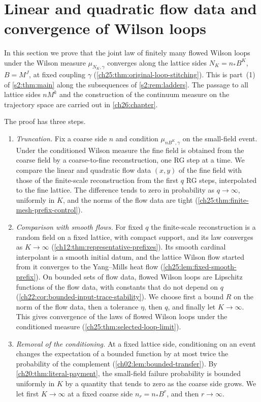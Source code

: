 \chapter{Linear and quadratic flow data and convergence of Wilson loops}\label{ch25:chapter}

In this section we prove that the joint law of finitely many flowed Wilson loops under the Wilson measure $\mu_{N_K,\gamma}$ converges along the lattice sides $N_K=n_*B^K$, $B=M^J$, at fixed coupling $\gamma$ (\cref{ch25:thm:original-loop-stitching}). This is part~(1) of \cref{s2:thm:main} along the subsequences of \cref{s2:rem:ladders}. The passage to all lattice sides $nM^k$ and the construction of the continuum measure on the trajectory space are carried out in \cref{ch26:chapter}.

The proof has three steps.
\begin{enumerate}
\item \emph{Truncation.} Fix a coarse side $n$ and condition $\mu_{nB^K,\gamma}$ on the small-field event. Under the conditioned Wilson measure the fine field is obtained from the coarse field by a coarse-to-fine reconstruction, one RG step at a time. We compare the linear and quadratic flow data $(x,y)$ of the fine field with those of the finite-scale reconstruction from the first $q$ RG steps, interpolated to the fine lattice. The difference tends to zero in probability as $q\to\infty$, uniformly in $K$, and the norms of the flow data are tight (\cref{ch25:thm:finite-mesh-prefix-control}).
\item \emph{Comparison with smooth flows.} For fixed $q$ the finite-scale reconstruction is a random field on a fixed lattice, with compact support, and its law converges as $K\to\infty$ (\cref{ch12:thm:representative-prefixes}). Its smooth cardinal interpolant is a smooth initial datum, and the lattice Wilson flow started from it converges to the Yang--Mills heat flow (\cref{ch25:lem:fixed-smooth-prefix}). On bounded sets of flow data, flowed Wilson loops are Lipschitz functions of the flow data, with constants that do not depend on $q$ (\cref{ch22:cor:bounded-input-trace-stability}). We choose first a bound $R$ on the norm of the flow data, then a tolerance $\eta$, then $q$, and finally let $K\to\infty$. This gives convergence of the laws of flowed Wilson loops under the conditioned measure (\cref{ch25:thm:selected-loop-limit}).
\item \emph{Removal of the conditioning.} At a fixed lattice side, conditioning on an event changes the expectation of a bounded function by at most twice the probability of the complement (\cref{ch02:lem:bounded-transfer}). By \cref{ch20:thm:literal-payment}, the small-field failure probability is bounded uniformly in $K$ by a quantity that tends to zero as the coarse side grows. We let first $K\to\infty$ at a fixed coarse side $n_r=n_*B^r$, and then $r\to\infty$.
\end{enumerate}

